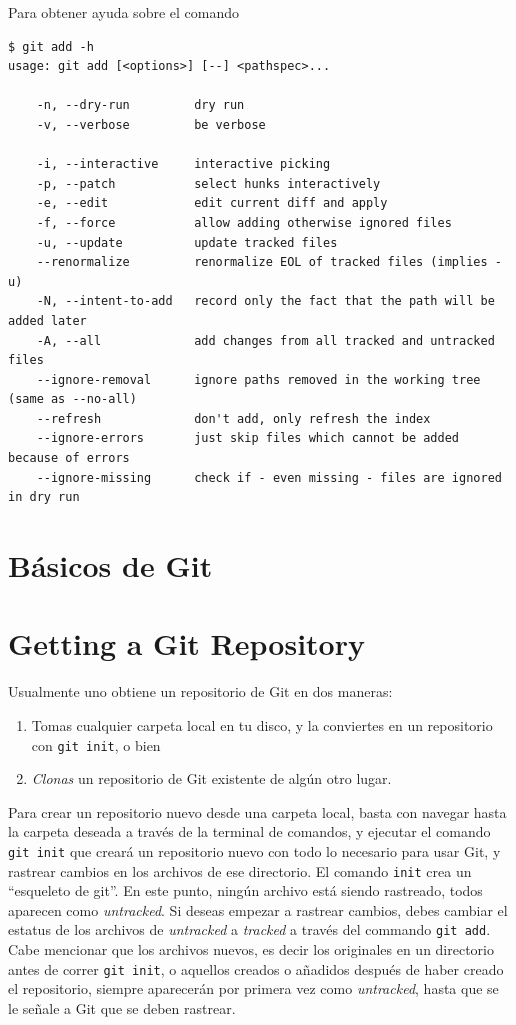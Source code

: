 \documentclass[spanish, 12pt, a4paper]{article}
\begin{document}
Para obtener ayuda sobre el comando

\begin{lstlisting}
$ git add -h
usage: git add [<options>] [--] <pathspec>...

    -n, --dry-run         dry run
    -v, --verbose         be verbose

    -i, --interactive     interactive picking
    -p, --patch           select hunks interactively
    -e, --edit            edit current diff and apply
    -f, --force           allow adding otherwise ignored files
    -u, --update          update tracked files
    --renormalize         renormalize EOL of tracked files (implies -u)
    -N, --intent-to-add   record only the fact that the path will be added later
    -A, --all             add changes from all tracked and untracked files
    --ignore-removal      ignore paths removed in the working tree (same as --no-all)
    --refresh             don't add, only refresh the index
    --ignore-errors       just skip files which cannot be added because of errors
    --ignore-missing      check if - even missing - files are ignored in dry run
\end{lstlisting}

\section{Básicos de Git}

\section{Getting a Git Repository}

Usualmente uno obtiene un repositorio de Git en dos maneras:

\begin{enumerate}
\def\labelenumi{\arabic{enumi}.}
\item
  Tomas cualquier carpeta local en tu disco, y la conviertes en un
  repositorio con \passthrough{\lstinline!git init!}, o bien
\item
  \emph{Clonas} un repositorio de Git existente de algún otro lugar.
\end{enumerate}

Para crear un repositorio nuevo desde una carpeta local, basta con
navegar hasta la carpeta deseada a través de la terminal de comandos, y
ejecutar el comando \passthrough{\lstinline!git init!} que creará un
repositorio nuevo con todo lo necesario para usar Git, y rastrear
cambios en los archivos de ese directorio. El comando
\passthrough{\lstinline!init!} crea un ``esqueleto de git''. En este
punto, ningún archivo está siendo rastreado, todos aparecen como
\emph{untracked}. Si deseas empezar a rastrear cambios, debes cambiar el
estatus de los archivos de \emph{untracked} a \emph{tracked} a través
del commando \passthrough{\lstinline!git add!}. Cabe mencionar que los
archivos nuevos, es decir los originales en un directorio antes de
correr \passthrough{\lstinline!git init!}, o aquellos creados o añadidos
después de haber creado el repositorio, siempre aparecerán por primera
vez como \emph{untracked}, hasta que se le señale a Git que se deben
rastrear.
\end{document}
